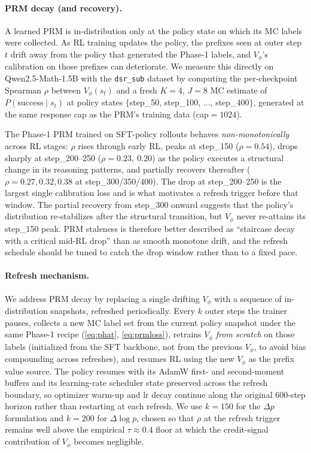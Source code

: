 \documentclass[11pt]{article}
\begin{document}
\paragraph{PRM decay (and recovery).}
A learned PRM is in-distribution only at the policy state on which
its MC labels were collected. As RL training updates the policy, the
prefixes seen at outer step $t$ drift away from the policy that
generated the Phase-1 labels, and $V_\phi$'s calibration on those
prefixes can deteriorate. We measure this directly on
Qwen2.5-Math-1.5B with the \texttt{dsr\_sub} dataset by computing the
per-checkpoint Spearman $\rho$ between $V_\phi(s_t)$ and a fresh
$K{=}4$, $J{=}8$ MC estimate of $P(\text{success} \mid s_t)$ at
policy states $\{$step\_50, step\_100, $\ldots$, step\_400$\}$,
generated at the same response cap as the PRM's training data
(cap${=}1024$).

The Phase-1 PRM trained on SFT-policy rollouts behaves
\emph{non-monotonically} across RL stages: $\rho$ rises through early
RL, peaks at step\_150 ($\rho{=}0.54$), drops sharply at
step\_200--250 ($\rho{=}0.23,\ 0.20$) as the policy executes a
structural change in its reasoning patterns, and partially recovers
thereafter ($\rho{=}0.27, 0.32, 0.38$ at step\_300/350/400). The
drop at step\_200--250 is the largest single calibration loss and is
what motivates a refresh trigger before that window. The partial
recovery from step\_300 onward suggests that the policy's
distribution re-stabilizes after the structural transition, but
$V_\phi$ never re-attains its step\_150 peak. PRM staleness is
therefore better described as ``staircase decay with a critical
mid-RL drop'' than as smooth monotone drift, and the refresh
schedule should be tuned to catch the drop window rather than to a
fixed pace.

\paragraph{Refresh mechanism.}
We address PRM decay by replacing a single drifting $V_\phi$ with a
sequence of in-distribution snapshots, refreshed periodically. Every
$k$ outer steps the trainer pauses, collects a new MC label set from
the current policy snapshot under the same Phase-1 recipe
(\eqref{eq:phat}, \eqref{eq:prmloss}), retrains $V_\phi$ \emph{from
scratch} on those labels (initialized from the SFT backbone, not from
the previous $V_\phi$, to avoid bias compounding across refreshes),
and resumes RL using the new $V_\phi$ as the prefix value source. The
policy resumes with its AdamW first- and second-moment buffers and
its learning-rate scheduler state preserved across the refresh
boundary, so optimizer warm-up and lr decay continue along the
original 600-step horizon rather than restarting at each refresh. We
use $k = 150$ for the $\Delta p$ formulation and $k = 200$ for
$\Delta\log p$, chosen so that $\rho$ at the refresh trigger remains
well above the empirical $\tau \approx 0.4$ floor at which the
credit-signal contribution of $V_\phi$ becomes negligible.
\end{document}
